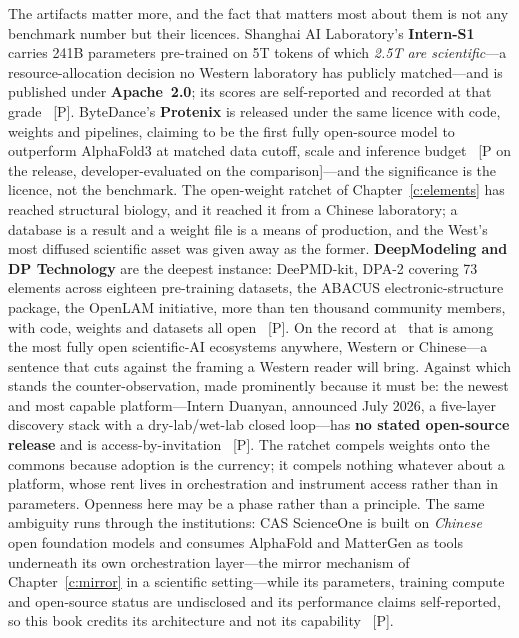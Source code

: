 The artifacts matter more, and the fact that matters most about them is not any benchmark number but their licences. Shanghai AI Laboratory's \textbf{Intern-S1} carries 241B parameters pre-trained on 5T tokens of which \emph{2.5T are scientific}---a resource-allocation decision no Western laboratory has publicly matched---and is published under \textbf{Apache~2.0}; its scores are self-reported and recorded at that grade~\cite{intern-s1-2025} [P]. ByteDance's \textbf{Protenix} is released under the same licence with code, weights and pipelines, claiming to be the first fully open-source model to outperform AlphaFold3 at matched data cutoff, scale and inference budget~\cite{protenix} [P on the release, developer-evaluated on the comparison]---and the significance is the licence, not the benchmark. The open-weight ratchet of Chapter~\ref{c:elements} has reached structural biology, and it reached it from a Chinese laboratory; a database is a result and a weight file is a means of production, and the West's most diffused scientific asset was given away as the former. \textbf{DeepModeling and DP Technology} are the deepest instance: DeePMD-kit, DPA-2 covering 73 elements across eighteen pre-training datasets, the ABACUS electronic-structure package, the OpenLAM initiative, more than ten thousand community members, with code, weights and datasets all open~\cite{deepmodeling} [P]. On the record at \datafreeze\ that is among the most fully open scientific-AI ecosystems anywhere, Western or Chinese---a sentence that cuts against the framing a Western reader will bring. Against which stands the counter-observation, made prominently because it must be: the newest and most capable platform---Intern Duanyan, announced July 2026, a five-layer discovery stack with a dry-lab/wet-lab closed loop---has \textbf{no stated open-source release} and is access-by-invitation~\cite{intern-s1-2025} [P]. The ratchet compels weights onto the commons because adoption is the currency; it compels nothing whatever about a platform, whose rent lives in orchestration and instrument access rather than in parameters. Openness here may be a phase rather than a principle. The same ambiguity runs through the institutions: CAS ScienceOne is built on \emph{Chinese} open foundation models and consumes AlphaFold and MatterGen as tools underneath its own orchestration layer---the mirror mechanism of Chapter~\ref{c:mirror} in a scientific setting---while its parameters, training compute and open-source status are undisclosed and its performance claims self-reported, so this book credits its architecture and not its capability~\cite{cas-scienceone} [P].

